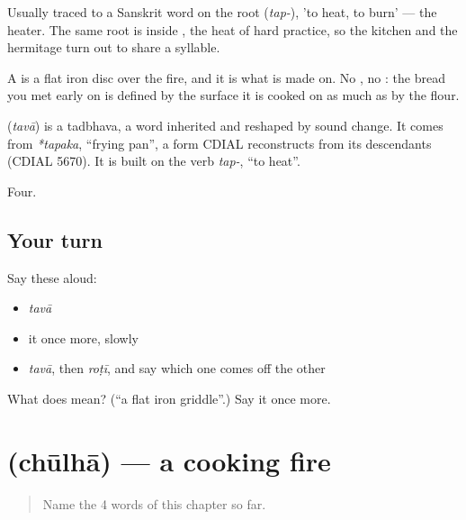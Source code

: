 Usually traced to a Sanskrit word on the root  (\emph{tap-}), 'to heat, to burn' — the heater. The same root is inside , the heat of hard practice, so the kitchen and the hermitage turn out to share a syllable.

A  is a flat iron disc over the fire, and it is what  is made on. No , no : the bread you met early on is defined by the surface it is cooked on as much as by the flour.

\begin{cousinweb}
\textbf{} (\emph{tavā}) is a tadbhava, a word inherited and reshaped by sound change. It comes from \emph{*tapaka}, \textquotedblleft{}frying pan\textquotedblright{}, a form CDIAL reconstructs from its descendants (CDIAL 5670). It is built on the verb \emph{tap-}, \textquotedblleft{}to heat\textquotedblright{}.
\end{cousinweb}

\begin{grammarlens}[title={What you've built}]
Four.
\end{grammarlens}

\subsection*{Your turn}
Say these aloud:

\begin{itemize}
\raggedright
  \item \emph{tavā}
  \item it once more, slowly
  \item \emph{tavā}, then \emph{roṭī}, and say which one comes off the other
\end{itemize}

\begin{tcolorbox}[breakable,colback=teal!4,colframe=teal!35!black,title={Before you move on}]
What does  mean? (\textquotedblleft{}a flat iron griddle\textquotedblright{}.) Say it once more.
\end{tcolorbox}
\section[\texorpdfstring{\hi{चूल्हा} (chūlhā)}{चूल्हा (chūlhā)}]{ (chūlhā) — a cooking fire}

\label{lesson:HI-C61-stove}



\begin{quote}
Name the 4 words of this chapter so far.
\end{quote}

